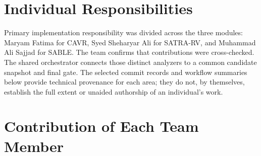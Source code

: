 \section{Individual Responsibilities}

Primary implementation responsibility was divided across the three modules: Maryam Fatima for CAVR, Syed Sheharyar Ali for SATRA-RV, and Muhammad Ali Sajjad for SABLE. The team confirms that contributions were cross-checked. The shared orchestrator connects those distinct analyzers to a common candidate snapshot and final gate. The selected commit records and workflow summaries below provide technical provenance for each area; they do not, by themselves, establish the full extent or unaided authorship of an individual's work.

\section{Contribution of Each Team Member}

